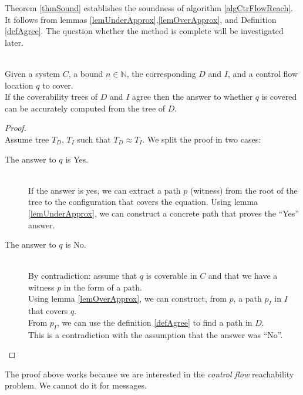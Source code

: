 \documentclass[a4paper]{report}
\numberwithin{algorithm}{chapter}
\begin{document}
Theorem \ref{thmSound} establishes the soundness of algorithm \ref{algCtrFlowReach}.
It follows from lemmas \ref{lemUnderApprox},\ref{lemOverApprox}, and Definition \ref{defAgree}.
The question whether the method is complete will be investigated later.

\begin{thm}[Soundness] \mbox{}\\
\label{thmSound}
Given a system $C$, a bound $n \in \mathbb{N}$, the corresponding \dabs{} $D$ and \iabs{} $I$, and a control flow location $q$ to cover.\\
If the coverability trees of $D$ and $I$ agree then the answer to whether $q$ is covered can be accurately computed from the tree of $D$.
\end{thm}
\begin{proof} \mbox{}\\
Assume tree $T_D$, $T_I$ such that $T_D \approx T_I$.
We split the proof in two cases:

\begin{description}
\item[The answer to $q$ is Yes.]\mbox{}\\
If the answer is yes, we can extract a path $p$ (witness) from the root of the tree to the configuration that covers the equation.
Using lemma \ref{lemUnderApprox}, we can construct a concrete path that proves the ``Yes'' answer.
\item[The answer to $q$ is No.]\mbox{}\\
By contradiction: assume that $q$ is coverable in $C$ and that we have a witness $p$ in the form of a path.\\
Using lemma \ref{lemOverApprox}, we can construct, from $p$, a path $p_I$ in $I$ that covers $q$.\\
From $p_I$, we can use the definition \ref{defAgree} to find a path in $D$.\\
This is a contradiction with the assumption that the answer was ``No''.
\end{description}
\end{proof}

\begin{rem}
The proof above works because we are interested in the \emph{control flow} reachability problem.
We cannot do it for messages.
\end{rem}
\end{document}
